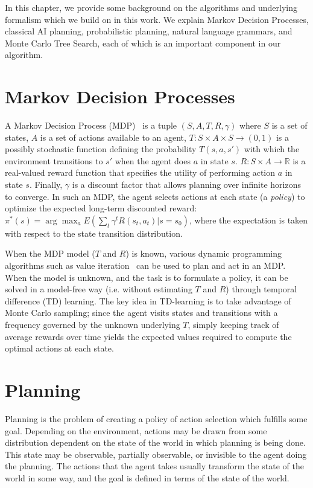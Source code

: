 In this chapter, we provide some background on the algorithms
and underlying formalism which we build on in this work.  We explain
Markov Decision Processes, classical AI planning, probabilistic planning,
natural language grammars, and Monte Carlo Tree Search, each of which
is an important component in our algorithm.

\section{Markov Decision Processes}
A Markov Decision Process (MDP)~\cite{puterman_1994_markov}
is a tuple $(S, A, T, R, \gamma)$ where $S$ is a
set of states, $A$ is a set of actions available to an agent,
$T:S\times A\times S \rightarrow (0,1)$ is a possibly stochastic
function defining the probability $T(s,a,s')$ with which the
environment transitions to $s'$ when the agent does $a$ in state $s$.
$R:S\times A \rightarrow \mathbb{R}$ is a real-valued reward function that
specifies the utility of performing action $a$ in state $s$. Finally,
$\gamma$ is a discount factor that allows planning over infinite
horizons to converge. In such an MDP, the agent selects actions at
each state (a {\em policy}) to optimize the expected long-term
discounted reward: $\pi^*(s)=\arg \max_a E(\sum_t \gamma^t
R(s_t,a_t)|s=s_0)$, where the expectation is taken with respect to the
state transition distribution.

When the MDP model ($T$ and $R$) is
known, various dynamic programming algorithms such as value
iteration~\cite{bellman_1957_dynamic} can be used to plan and act in an MDP. When the
model is unknown, and the task is to formulate a policy, it can be
solved in a model-free way (i.e. without estimating $T$ and $R$)
through temporal difference (TD) learning. The key idea in TD-learning
is to take advantage of Monte Carlo sampling; since the agent visits
states and transitions with a frequency governed by the unknown
underlying $T$, simply keeping track of average rewards over time
yields the expected values required to compute the optimal actions at
each state.


\section{Planning}
Planning is the problem of creating a policy of action selection which fulfills some goal.
Depending on the environment, actions may be drawn from some distribution
dependent on the state of the world in which planning is being done.  This
state may be observable, partially observable, or invisible to the agent doing
the planning.  The actions that the agent takes usually transform the state of
the world in some way, and the goal is defined in terms of the state of the
world.

